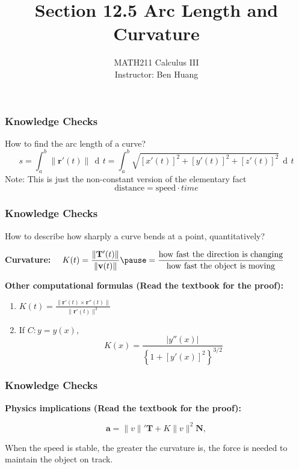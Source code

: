 \documentclass[10pt]{beamer}
\author[B.H.]{{\Large MATH211 Calculus III}\\\vspace{6pt}Instructor: Ben Huang}
\date{}
\title[Section 12.5]{Section 12.5 Arc Length and Curvature}
\institute[MU]{\texttt{[image: MCLogo-Bck.png]}}
\DeclareMathOperator{\xd}{\,d\!}
\newcommand{\norm}[1]{\lVert#1\rVert}
\begin{document}
\frame{\titlepage}



\begin{frame}
\frametitle{Knowledge Checks}
How to find the arc length of a curve?\pause
\[
s = \int_a^b \norm{\mathbf r'(t)}\xd t = \int_a^b \sqrt{[x'(t)]^2 + [y'(t)]^2 + [z'(t)]^2}\xd t
\]
\pause
Note: This is just the non-constant version of the elementary fact
\[
\text{distance} = \text{speed}\cdot{time}
\]
\end{frame}
\begin{frame}
\frametitle{Knowledge Checks}
How to describe how sharply a curve bends at a point, quantitatively?\pause
\vspace{1em}

{\bf Curvature:} $\displaystyle \quad K(t) = \frac{\norm{\mathbf T'(t)}}{\norm{\mathbf v(t)}}\pause = \frac{\text{how fast the direction is changing}}{\text{how fast the object is moving}}$\pause
\vspace{1em}

{
\bf Other computational formulas (Read the textbook for the proof):
}\pause
\vspace{1em}

\begin{enumerate}[label = \arabic*.]
\item
$\displaystyle K(t) = \frac{\norm{\mathbf r'(t)\times\mathbf r''(t)}}{\norm{\mathbf r'(t)}^3}$\pause
\vspace{1em}

\item If $C: y = y(x)$,  \[
K(x)=\frac{\lvert{y''(x)}\rvert}{\left\{1+[y'(x)]^2\right\}^{3/2}}
\]
\end{enumerate}
\end{frame}
\begin{frame}
\frametitle{Knowledge Checks}
{\bf Physics implications (Read the textbook for the proof):}
\vspace{1em}
\begin{tcolorbox}
\[
\mathbf a = \norm{v}'\mathbf T + K\norm{v}^2\mathbf N,
\]
\end{tcolorbox}
\vspace{1em}

When the speed is stable, the greater the curvature is, the  force is needed to maintain the object on track. 
\end{frame}
\end{document}
